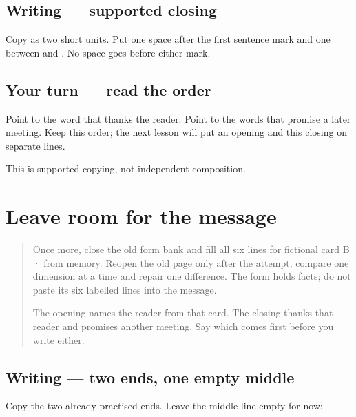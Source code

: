 \subsection*{Writing — supported closing}
Copy \textbf{  } as two short units. Put one space after the first sentence mark and one between \textbf{} and \textbf{}. No space goes before either mark.

\subsection*{Your turn — read the order}
Point to the word that thanks the reader. Point to the words that promise a later meeting. Keep this order; the next lesson will put an opening and this closing on separate lines.

\begin{tcolorbox}[breakable,colback=teal!4,colframe=teal!35!black,title={Before you move on}]
This is supported copying, not independent composition.
\end{tcolorbox}
\section[\texorpdfstring{\pa{ਨਮਸਤੇ} \pa{ਮਨਨ।} … (opening · closing)}{ਨਮਸਤੇ ਮਨਨ। … (opening · closing)}]{Leave room for the message}

\label{lesson:PA-W12-boundary}



\begin{quote}
Once more, close the old form bank and fill all six lines for fictional card B ·  from memory. Reopen the old page only after the attempt; compare one dimension at a time and repair one difference. The form holds facts; do not paste its six labelled lines into the message.

The opening names the reader from that card. The closing thanks that reader and promises another meeting. Say which comes first before you write either.
\end{quote}

\subsection*{Writing — two ends, one empty middle}
Copy the two already practised ends. Leave the middle line empty for now:

\begin{quote}
 
\end{quote}


